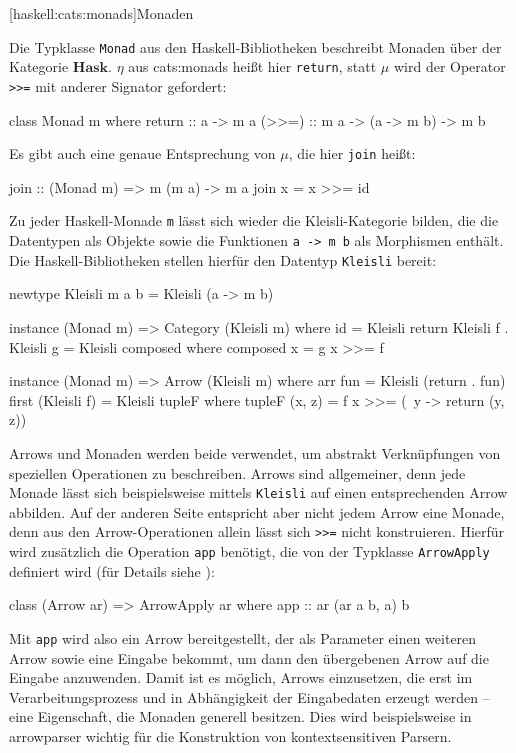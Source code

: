 \documentclass[11pt, a4paper, bibgerm]{scrbook}
\newenvironment{DIFnomarkup}{}{}
\newcommand\icode[1]{\lstinline?#1?}
\newcommand\lsubsection{}
\newcommand\sref{}
\begin{document}
\lsubsection[haskell:cats:monads]{Monaden}

Die Typklasse \icode{Monad} aus den Haskell-Bibliotheken beschreibt
Monaden über der Kategorie $\mathbf{Hask}$. $\eta$ aus
\sref{cats:monads} heißt hier \icode{return}, statt $\mu$ wird der
Operator \icode{>>=} %
mit anderer Signator gefordert:
\begin{DIFnomarkup}\begin{code}
class Monad m where
  return :: a -> m a
  (>>=)  :: m a -> (a -> m b) -> m b
\end{code}\end{DIFnomarkup} %
Es gibt auch eine genaue Entsprechung von $\mu$, die hier \icode{join}
heißt:
\begin{DIFnomarkup}\begin{code}
join :: (Monad m) => m (m a) -> m a
join x = x >>= id
\end{code}\end{DIFnomarkup} %

Zu jeder Haskell-Monade \icode{m} lässt sich wieder die
Kleisli-Kategorie bilden, die die Datentypen als Objekte sowie die
Funktionen \icode{a -> m b} als Morphismen enthält. Die
Haskell-Bibliotheken stellen hierfür den Datentyp \icode{Kleisli}
bereit:
\begin{DIFnomarkup}\begin{code}
newtype Kleisli m a b = Kleisli (a -> m b)

instance (Monad m) => Category (Kleisli m)
  where id = Kleisli return
        Kleisli f . Kleisli g = Kleisli composed
          where composed x = g x >>= f

instance (Monad m) => Arrow (Kleisli m)
  where arr fun = Kleisli (return . fun)
        first (Kleisli f) = Kleisli tupleF
          where tupleF (x, z) = f x >>= (\ y -> return (y, z))
\end{code}\end{DIFnomarkup} %

Arrows und Monaden werden beide verwendet, um abstrakt Verknüpfungen von
speziellen Operationen zu beschreiben. Arrows sind allgemeiner, denn
jede Monade lässt sich beispielsweise mittels \icode{Kleisli} auf einen
entsprechenden Arrow abbilden. Auf der anderen Seite entspricht aber
nicht jedem Arrow eine Monade, denn aus den Arrow-Operationen allein
lässt sich \icode{>>=} %
nicht konstruieren. Hierfür wird zusätzlich die Operation \icode{app}
benötigt, die von der Typklasse \icode{ArrowApply} definiert wird (für
Details siehe \cite[S. 18f]{Hughes}):
\begin{DIFnomarkup}\begin{code}
class (Arrow ar) => ArrowApply ar where
  app :: ar (ar a b, a) b
\end{code}\end{DIFnomarkup}
Mit \icode{app} wird also ein Arrow bereitgestellt, der als Parameter
einen weiteren Arrow sowie eine Eingabe bekommt, um dann den übergebenen
Arrow auf die Eingabe anzuwenden. Damit ist es möglich, Arrows
einzusetzen, die erst im Verarbeitungsprozess und in Abhängigkeit der
Eingabedaten erzeugt werden -- eine Eigenschaft, die Monaden generell
besitzen. Dies wird beispielsweise in \sref{arrowparser} wichtig für
die Konstruktion von kontextsensitiven Parsern.
\end{document}
